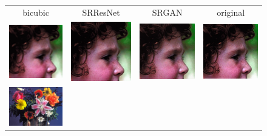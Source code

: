 \documentclass[10pt,twocolumn,letterpaper]{article}
\begin{document}
\begin{figure}[h!] 
  	\begin{tabular}{cccc}
  		 bicubic & SRResNet & SRGAN & original \\
     	\includegraphics[width=1.5in]{images/used/appendix/jpg/Set14/face_bicubic}&
     	\includegraphics[width=1.5in]{images/used/appendix/jpg/Set14/face_SRResNet-MSE} &
     	\includegraphics[width=1.5in]{images/used/appendix/jpg/Set14/face_SRGAN-VGG54} &
     	\includegraphics[width=1.5in]{images/used/appendix/jpg/Set14/face_HR} \\
     	\includegraphics[width=1.5in]{images/used/appendix/jpg/Set14/flowers_bicubic}&

\end{tabular}
\end{figure}
\end{document}
